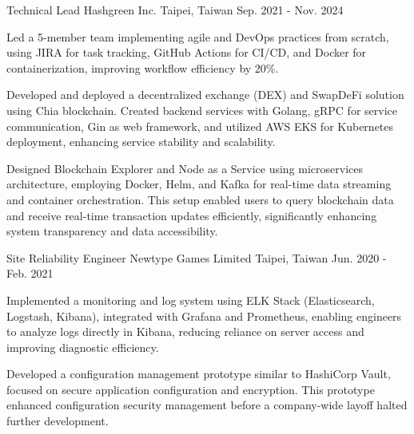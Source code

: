 

\begin{cventries}

\cventry
{Technical Lead} %
{Hashgreen Inc.} %
{Taipei, Taiwan} %
{Sep. 2021 - Nov. 2024} %
{
  \begin{cvitems} %
    \item {Led a 5-member team implementing agile and DevOps practices from scratch, using JIRA for task tracking, GitHub Actions for CI/CD, and Docker for containerization, improving workflow efficiency by 20\%.}
    \item {Developed and deployed a decentralized exchange (DEX) and SwapDeFi solution using Chia blockchain. Created backend services with Golang, gRPC for service communication, Gin as web framework, and utilized AWS EKS for Kubernetes deployment, enhancing service stability and scalability.}
    \item {Designed Blockchain Explorer and Node as a Service using microservices architecture, employing Docker, Helm, and Kafka for real-time data streaming and container orchestration. This setup enabled users to query blockchain data and receive real-time transaction updates efficiently, significantly enhancing system transparency and data accessibility.}
  \end{cvitems}
}

\cventry
{Site Reliability Engineer} %
{Newtype Games Limited} %
{Taipei, Taiwan} %
{Jun. 2020 - Feb. 2021} %
{
  \begin{cvitems} %
    \item {Implemented a monitoring and log system using ELK Stack (Elasticsearch, Logstash, Kibana), integrated with Grafana and Prometheus, enabling engineers to analyze logs directly in Kibana, reducing reliance on server access and improving diagnostic efficiency.}
    \item {Developed a configuration management prototype similar to HashiCorp Vault, focused on secure application configuration and encryption. This prototype enhanced configuration security management before a company-wide layoff halted further development.}
  \end{cvitems}
}


\end{cventries}

